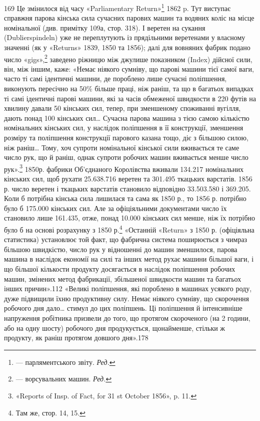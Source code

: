 169 Це змінилося від часу «Parliamentary Return»\footnote*{
— парляментського звіту. \emph{Ред.}
} 1862 p. Тут
виступає справжня парова кінська сила сучасних парових машин та водяних
коліс на місце номінальної (див. примітку 109а, стор. 318). І веретен
на сукання (Dublierspindeln) уже не переплутують із прядільними веретенами
у власному значенні (як у «Returns» 1839, 1850 та 1856); далі
для вовняних фабрик подано число «gigs»,\footnote*{
— ворсувальних машин. \emph{Ред.}
} заведено ріжницю між джулише
показником (Index) дійсної сили, він, між іншим, каже:
«Немає ніякого сумніву, що парові машини тієї самої ваги, часто
ті самі ідентичні машини, де пороблено лише сучасні поліпшення,
виконують пересічно на 50\% більше праці, ніж раніш, та що в
багатьох випадках ті самі ідентичні парові машини, які за часів
обмеженої швидкости в 220 футів на хвилину давали 50 кінських
сил, тепер, при зменшеному споживанні вугілля, дають понад 100
кінських сил\dots{} Сучасна парова машина з тією самою кількістю
номінальних кінських сил, у наслідок поліпшення в її конструкції,
зменшення розміру та поліпшення конструкції парового
казана тощо, діє з більшою силою, ніж раніш\dots{} Тому, хоч супроти
номінальної кінської сили вживається те саме число рук, що й
раніш, однак супроти робочих машин вживається менше число
рук».\footnote{
«Reports of Insp. of Fact, for 31 st October 1856», p. 11.
} 1850р. фабрики Об’єднаного Королівства вживали 134.217
номінальних кінських сил, щоб рухати 25.638.716 веретен та
301.495 ткацьких варстатів. 1856 р. число веретен і ткацьких
варстатів становило відповідно 33.503.580 і 369.205. Коли б
потрібна кінська сила лишилася та сама як 1850 р., то 1856 р.
потрібно було б 175.000 кінських сил. Але за офіціяльними документами
число їх становило лише 161.435, отже, понад 10.000
кінських сил менше, ніж їх потрібно було б на основі розрахунку
з 1850 р.\footnote{
Там же, стор. 14, 15.
} «Останній «Return» з 1850 р. (офіціяльна статистика)
установлює той факт, що фабрична система поширюється з чимраз
більшою швидкістю, число рук у відношенні до машин зменшилося,
парова машина в наслідок економії на силі та інших
метод рухає машини більшої ваги, і що більшої кількости продукту
досягається в наслідок поліпшення робочих машин, змінених
метод фабрикації, збільшеної швидкости машин та багатьох інших
причин».112 «Великі поліпшення, які пороблено в машинах
усякого роду, дуже підвищили їхню продуктивну силу. Немає
ніякого сумніву, що скорочення робочого дня дало\dots{} стимул
до цих поліпшень. Ці поліпшення й інтенсивніше напруження
робітника призвели до того, що протягом скороченого (на 2 години,
або на одну шосту) робочого дня продукується, щонайменше,
стільки ж продукту, як раніш протягом довшого дня».178

